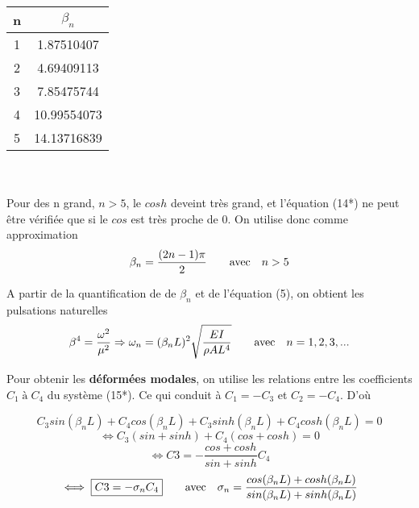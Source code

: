 \documentclass[a4paper,10pt]{article}
\begin{document}
\begin{tabular}{|c|c|}
\hline
n & \begin{math} \beta_n \end{math} \\ \hline
1 & 1.87510407 \\ \hline
2 & 4.69409113 \\ \hline
3 & 7.85475744	\\ \hline
4 & 10.99554073	\\ \hline
5 & 14.13716839	\\ \hline
\end{tabular}
\\\\
Pour des n grand, \begin{math} n>5 \end{math}, le \begin{math} cosh \end{math} deveint très grand, et l'équation (14*) ne peut être vérifiée que si le \begin{math} cos \end{math} est très proche de 0. On utilise donc comme approximation \begin{equation} \beta_n = \frac{(2n-1)\pi}{2} \text{\qquad avec\quad} n>5\end{equation}

A partir de la quantification de de \begin{math} \beta_n \end{math} et de l'équation (5), on obtient les pulsations naturelles
\begin{equation}  \beta^4 = \frac{\omega^2}{\mu^2}\Rightarrow  \omega_n = (\beta_n L)^2 \sqrt{  \frac{EI}{\rho A L^4}}  \text{\qquad avec\quad} n=1,2,3,... \end{equation}

Pour obtenir les \textbf{déformées modales}, on utilise les relations entre les coefficients \begin{math} C_1 \; à \;  C_4 \end{math} du système (15*).
Ce qui conduit à \begin{math} C_1=-C_3 \end{math} et \begin{math}  C_2 = -C_4 \end{math}.
D'où

\begin{equation} C_3 sin(\beta_n L)  + C_4 cos(\beta_n L)  +  C_3 sinh(\beta_n L)  + C_4 cosh(\beta_n L)  =  0  \end{equation}
\begin{equation} \iff C_3 (sin + sinh) + C_4 (cos + cosh) = 0  \end{equation}
\begin{equation} \iff C3 = - \frac{cos + cosh}{sin + sinh}C_4 \end{equation}
\begin{equation} \iff \boxed{C3 = - \sigma_n C_4} \text{\qquad avec\quad} \sigma_n= \frac{cos(\beta_n L) + cosh(\beta_n L)}{sin(\beta_n L) + sinh(\beta_n L)}\end{equation}
\end{document}
